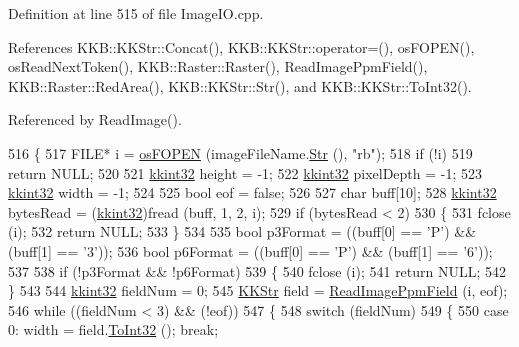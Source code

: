 Definition at line 515 of file Image\+I\+O.\+cpp.



References K\+K\+B\+::\+K\+K\+Str\+::\+Concat(), K\+K\+B\+::\+K\+K\+Str\+::operator=(), os\+F\+O\+P\+E\+N(), os\+Read\+Next\+Token(), K\+K\+B\+::\+Raster\+::\+Raster(), Read\+Image\+Ppm\+Field(), K\+K\+B\+::\+Raster\+::\+Red\+Area(), K\+K\+B\+::\+K\+K\+Str\+::\+Str(), and K\+K\+B\+::\+K\+K\+Str\+::\+To\+Int32().



Referenced by Read\+Image().


\begin{DoxyCode}
516 \{
517   FILE* i = \hyperlink{namespace_k_k_b_abf4050d2916ded8349dafadc80f0ecd1}{osFOPEN} (imageFileName.\hyperlink{class_k_k_b_1_1_k_k_str_ad574e6c0fe7f6ce1ba3ab0a8ce2fbd52}{Str} (), \textcolor{stringliteral}{"rb"});
518   \textcolor{keywordflow}{if}  (!i)
519     \textcolor{keywordflow}{return} NULL;
520 
521   \hyperlink{namespace_k_k_b_a8fa4952cc84fda1de4bec1fbdd8d5b1b}{kkint32}  height     = -1;
522   \hyperlink{namespace_k_k_b_a8fa4952cc84fda1de4bec1fbdd8d5b1b}{kkint32}  pixelDepth = -1;
523   \hyperlink{namespace_k_k_b_a8fa4952cc84fda1de4bec1fbdd8d5b1b}{kkint32}  width      = -1;
524 
525   \textcolor{keywordtype}{bool}  eof = \textcolor{keyword}{false};
526   
527   \textcolor{keywordtype}{char}  buff[10];
528   \hyperlink{namespace_k_k_b_a8fa4952cc84fda1de4bec1fbdd8d5b1b}{kkint32}  bytesRead = (\hyperlink{namespace_k_k_b_a8fa4952cc84fda1de4bec1fbdd8d5b1b}{kkint32})fread (buff, 1, 2, i);
529   \textcolor{keywordflow}{if}  (bytesRead < 2)
530   \{
531     fclose (i);
532     \textcolor{keywordflow}{return} NULL;
533   \}
534 
535   \textcolor{keywordtype}{bool}  p3Format = ((buff[0] == \textcolor{charliteral}{'P'})  &&  (buff[1] == \textcolor{charliteral}{'3'}));
536   \textcolor{keywordtype}{bool}  p6Format = ((buff[0] == \textcolor{charliteral}{'P'})  &&  (buff[1] == \textcolor{charliteral}{'6'}));
537 
538   \textcolor{keywordflow}{if}  (!p3Format  &&  !p6Format)
539   \{
540     fclose (i);
541     \textcolor{keywordflow}{return} NULL;
542   \}
543 
544   \hyperlink{namespace_k_k_b_a8fa4952cc84fda1de4bec1fbdd8d5b1b}{kkint32}  fieldNum = 0;
545   \hyperlink{class_k_k_b_1_1_k_k_str}{KKStr}  field =  \hyperlink{namespace_k_k_b_ade6c5f0d9736c3f249ae35cd3d067151}{ReadImagePpmField} (i, eof);
546   \textcolor{keywordflow}{while}  ((fieldNum  < 3)  &&  (!eof))
547   \{
548     \textcolor{keywordflow}{switch}  (fieldNum)
549     \{
550     \textcolor{keywordflow}{case}  0: width      = field.\hyperlink{class_k_k_b_1_1_k_k_str_ab3b9de5eb86600593ac866e8323caa32}{ToInt32} ();   \textcolor{keywordflow}{break};

\end{DoxyCode}
